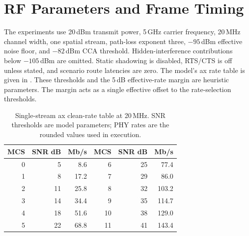 \appendices
\section{RF Parameters and Frame Timing}
\label{app:timing}

The experiments use 20\,dBm transmit power, 5\,GHz carrier frequency,
20\,MHz channel width, one spatial stream, path-loss exponent three,
$-95$\,dBm effective noise floor, and $-82$\,dBm CCA threshold.
Hidden-interference contributions below $-105$\,dBm are omitted. Static
shadowing is disabled, RTS/CTS is off unless stated, and scenario route
latencies are zero. The model's ax rate table is given in
. These thresholds and the 5\,dB effective-rate
margin are heuristic parameters. The margin acts as a single effective
offset to the rate-selection thresholds.

\begin{table}[t]
\centering
\caption{Single-stream ax clean-rate table at 20\,MHz. SNR thresholds are
model parameters; PHY rates are the rounded values used in execution.}
\label{tab:mcs_parameters}
\begin{tabular}{rrrrrr}
\toprule
MCS & SNR dB & Mb/s & MCS & SNR dB & Mb/s \\
\midrule
0 & 5 & 8.6 & 6 & 25 & 77.4 \\
1 & 8 & 17.2 & 7 & 29 & 86.0 \\
2 & 11 & 25.8 & 8 & 32 & 103.2 \\
3 & 14 & 34.4 & 9 & 35 & 114.7 \\
4 & 18 & 51.6 & 10 & 38 & 129.0 \\
5 & 22 & 68.8 & 11 & 41 & 143.4 \\
\bottomrule
\end{tabular}
\end{table}

